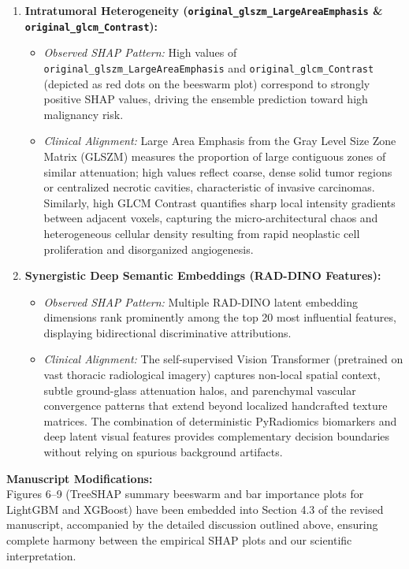 \documentclass[11pt,a4paper]{article}
\newenvironment{authorresponse}{\par\begingroup\color{authorblue}}{\endgroup\par}
\begin{document}
\begin{authorresponse}
\begin{enumerate}[leftmargin=2em]
  \item \textbf{Intratumoral Heterogeneity (\texttt{original\_glszm\_LargeAreaEmphasis} \& \texttt{original\_glcm\_Contrast}):}
  \begin{itemize}
    \item \textit{Observed SHAP Pattern:} High values of \texttt{original\_glszm\_LargeAreaEmphasis} and \texttt{original\_glcm\_Contrast} (depicted as red dots on the beeswarm plot) correspond to strongly positive SHAP values, driving the ensemble prediction toward high malignancy risk.
    \item \textit{Clinical Alignment:} Large Area Emphasis from the Gray Level Size Zone Matrix (GLSZM) measures the proportion of large contiguous zones of similar attenuation; high values reflect coarse, dense solid tumor regions or centralized necrotic cavities, characteristic of invasive carcinomas. Similarly, high GLCM Contrast quantifies sharp local intensity gradients between adjacent voxels, capturing the micro-architectural chaos and heterogeneous cellular density resulting from rapid neoplastic cell proliferation and disorganized angiogenesis.
  \end{itemize}
  
  \item \textbf{Synergistic Deep Semantic Embeddings (RAD-DINO Features):}
  \begin{itemize}
    \item \textit{Observed SHAP Pattern:} Multiple RAD-DINO latent embedding dimensions rank prominently among the top 20 most influential features, displaying bidirectional discriminative attributions.
    \item \textit{Clinical Alignment:} The self-supervised Vision Transformer (pretrained on vast thoracic radiological imagery) captures non-local spatial context, subtle ground-glass attenuation halos, and parenchymal vascular convergence patterns that extend beyond localized handcrafted texture matrices. The combination of deterministic PyRadiomics biomarkers and deep latent visual features provides complementary decision boundaries without relying on spurious background artifacts.
  \end{itemize}
\end{enumerate}

\textbf{Manuscript Modifications:}\\
Figures 6--9 (TreeSHAP summary beeswarm and bar importance plots for LightGBM and XGBoost) have been embedded into Section 4.3 of the revised manuscript, accompanied by the detailed discussion outlined above, ensuring complete harmony between the empirical SHAP plots and our scientific interpretation.
\end{authorresponse}
\end{document}
